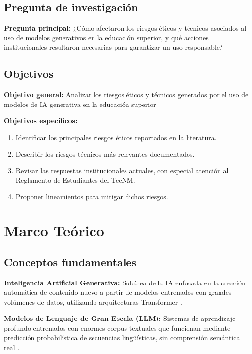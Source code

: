 \documentclass[review]{elsarticle}
\begin{document}
	\subsection{Pregunta de investigación}
	
	\textbf{Pregunta principal:} ¿Cómo afectaron los riesgos éticos y técnicos asociados al uso de modelos generativos en la educación superior, y qué acciones institucionales resultaron necesarias para garantizar un uso responsable?
	
	\subsection{Objetivos}
	
	\textbf{Objetivo general:} Analizar los riesgos éticos y técnicos generados por el uso de modelos de IA generativa en la educación superior.
	
	\textbf{Objetivos específicos:}
	\begin{enumerate}
		\item Identificar los principales riesgos éticos reportados en la literatura.
		\item Describir los riesgos técnicos más relevantes documentados.
		\item Revisar las respuestas institucionales actuales, con especial atención al Reglamento de Estudiantes del TecNM.
		\item Proponer lineamientos para mitigar dichos riesgos.
	\end{enumerate}
	
	\section{Marco Teórico}
	
	\subsection{Conceptos fundamentales}
	
	\textbf{Inteligencia Artificial Generativa:} Subárea de la IA enfocada en la creación automática de contenido nuevo a partir de modelos entrenados con grandes volúmenes de datos, utilizando arquitecturas Transformer \citep{vaswani2017}.
	
	\textbf{Modelos de Lenguaje de Gran Escala (LLM):} Sistemas de aprendizaje profundo entrenados con enormes corpus textuales que funcionan mediante predicción probabilística de secuencias lingüísticas, sin comprensión semántica real \citep{bender2021}.
	
\end{document}
